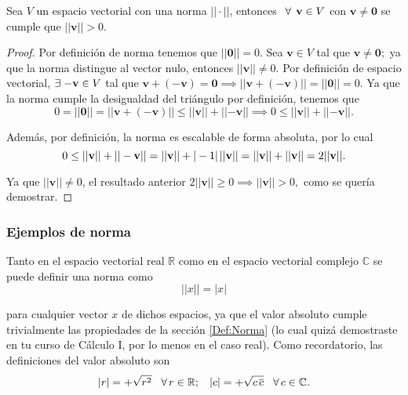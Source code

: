 \documentclass[12pt,dvipsnames]{article}
\newenvironment{corolario}[2][Corolario]{\begin{trivlist}
\item[\hskip \labelsep {\bfseries #1}\hskip \labelsep {\bfseries #2.}]}{\end{trivlist}}
\begin{document}
\begin{corolario} {2.2.1.1}
    Sea $V$ un espacio vectorial con una norma $||\cdot ||$, entonces $\hspace{1.5mm}\forall\hspace{1.5mm} \mathbf{v}\in V$ con $\mathbf{v}\neq\mathbf{0}$ se cumple que $||\mathbf{v}||>0.$

\begin{proof}
    Por definición de norma tenemos que $||\mathbf{0}||=0$. Sea $\mathbf{v}\in V$ tal que $\mathbf{v}\neq\mathbf{0};$ ya que la norma distingue al vector nulo, entonces $||\mathbf{v}||\neq 0.$ Por definición de espacio vectorial, $\exists\hspace{1mm} \mathbf{-v}\in V$ tal que $\mathbf{v}+(-\mathbf{v})=\mathbf{0}\implies ||\mathbf{v}+(-\mathbf{v})||=||\mathbf{0}||=0$. Ya que la norma cumple la desigualdad del triángulo por definición, tenemos que $$0=||\mathbf{0}||=||\mathbf{v}+(-\mathbf{v})||\leq ||\mathbf{v}||+||\mathbf{-v}||\implies 0\leq ||\mathbf{v}||+||\mathbf{-v}||.$$

\noindent Además, por definición, la norma es escalable de forma absoluta, por lo cual $$0\leq ||\mathbf{v}||+||-\mathbf{v}||=||\mathbf{v}||+|-1|\hspace{0.5mm} ||\mathbf{v}||=||\mathbf{v}||+||\mathbf{v}||=2||\mathbf{v}||.$$

\noindent Ya que $||\mathbf{v}||\neq 0$, el resultado anterior $2||\mathbf{v}||\geq 0\implies ||\mathbf{v}||>0,$ como se quería demostrar.

\end{proof}

\end{corolario}

\subsubsection{Ejemplos de norma}

Tanto en el espacio vectorial real $\mathbb{R}$ como en el espacio vectorial complejo $\mathbb{C}$ se puede definir una norma como $$||x|| = |x|$$

\noindent para cualquier vector $x$ de dichos espacios, ya que el valor absoluto cumple trivialmente las propiedades de la sección \ref{Def:Norma} (lo cual quizá demostraste en tu curso de Cálculo I, por lo menos en el caso real). Como recordatorio, las definiciones del valor absoluto son $$|r| = +\sqrt{r^2} \hspace{3mm}\forall\hspace{0.5mm}r\in\mathbb{
R}; \hspace{3mm} |c| = +\sqrt{c\hspace{0.5mm}\overline{c}}\hspace{3mm}\forall\hspace{0.5mm}c\in\mathbb{C}.$$
\end{document}
